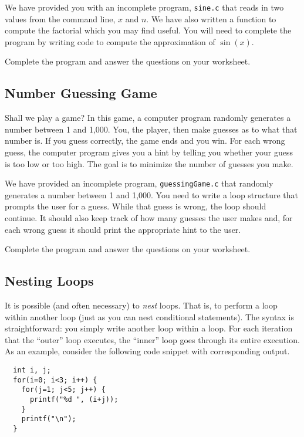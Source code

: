 \documentclass[12pt]{scrartcl}
\begin{document}
We have provided you with an incomplete program, \texttt{sine.c} 
that reads in two values from the command line, $x$ and $n$.  We have also 
written a function to compute the factorial which you may find useful.  
You will need to complete the program by writing code to compute 
the approximation of $\sin(x)$.

Complete the program and answer the questions on your worksheet. 

\subsection{Number Guessing Game}

Shall we play a game?  In this game, a computer program randomly 
generates a number between 1 and 1,000.  You, the player, then 
make guesses as to what that number is.  If you guess correctly, 
the game ends and you win.  For each wrong guess, the computer 
program gives you a hint by telling you whether your guess is too 
low or too high.  The goal is to minimize the number of guesses 
you make.

We have provided an incomplete program, \texttt{guessingGame.c} 
that randomly generates a number between 1 and 1,000.  You 
need to write a loop structure that prompts the user for a guess.  
While that guess is wrong, the loop should continue.  It should 
also keep track of how many guesses the user makes and, for 
each wrong guess it should print the appropriate hint to the user.

Complete the program and answer the questions on your worksheet. 

\subsection{Nesting Loops}

It is possible (and often necessary) to \emph{nest} loops.  That is, to 
perform a loop within another loop (just as you can nest conditional 
statements).  The syntax is straightforward: you simply write another 
loop within a loop.  For each iteration that the ``outer'' loop executes, 
the ``inner'' loop goes through its entire execution.  As an example, 
consider the following code snippet with corresponding output.

\begin{verbatim}
  int i, j;
  for(i=0; i<3; i++) {
    for(j=1; j<5; j++) {
      printf("%d ", (i+j));
    }
    printf("\n");
  }
\end{verbatim}
\end{document}
